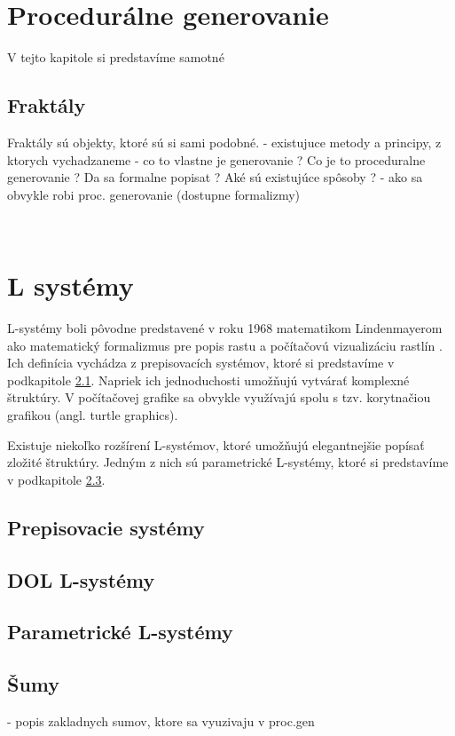 \chapter{Procedurálne generovanie}
V tejto kapitole si predstavíme samotné 

\section{Fraktály}
Fraktály sú objekty, ktoré sú si sami podobné. 
	- existujuce metody a principy, z ktorych vychadzaneme
	- co to vlastne je generovanie ? Co je to proceduralne generovanie ?
		Da sa formalne popisat ? Aké sú existujúce spôsoby ?
	- ako sa obvykle robi proc. generovanie (dostupne formalizmy)
	
\
\chapter{L systémy}
L-systémy boli pôvodne predstavené v roku 1968 matematikom Lindenmayerom ako matematický formalizmus pre popis rastu a počítačovú vizualizáciu rastlín \cite{Lsystems}.
Ich definícia vychádza z prepisovacích systémov, ktoré si predstavíme v podkapitole \ref{rewriting}.
Napriek ich jednoduchosti umožňujú vytvárať komplexné štruktúry. V počítačovej grafike sa obvykle využívajú spolu s tzv. korytnačiou grafikou (angl. turtle graphics).

Existuje niekoľko rozšírení L-systémov, ktoré umožňujú elegantnejšie popísať zložité štruktúry. Jedným z nich sú parametrické L-systémy, ktoré si predstavíme v podkapitole
\ref{parametric}.

\section{Prepisovacie systémy}\label{rewriting}
\section{DOL L-systémy}\label{dollsystems}
\section{Parametrické L-systémy}\label{parametric}
\section{Šumy}
		- popis zakladnych sumov, ktore sa vyuzivaju v proc.gen


